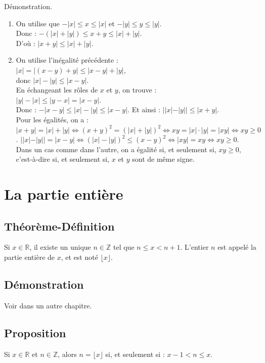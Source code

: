 \documentclass{article}
\begin{document}
		Démonstration. 
		\begin{enumerate}
			\item On utilise que $-|x| \leq x \leq |x|$ et $-|y| \leq y \leq |y|$. \\
			 Donc : $- (|x| + |y|) \leq x + y \leq |x| + |y|$. \\
			  D'où : $|x + y| \leq |x| + |y|$.
			\item On utilise l'inégalité précédente : \\ $|x| = |(x - y) + y| \leq |x - y| + |y|$,\\ donc $|x| - |y| \leq |x - y|$. \\ En échangeant les rôles de $x$ et $y$, on trouve : \\ $|y| - |x| \leq |y - x| = |x - y|$. \\ Donc : $-|x - y| \leq |x| - |y| \leq |x - y|$. Et ainsi : $||x| - |y|| \leq |x + y|$. \\ Pour les égalités, on a : $|x + y| = |x| + |y| \Leftrightarrow (x + y)^2 = (|x| + |y|)^2 \Leftrightarrow xy = |x| \cdot |y| = |xy| \Leftrightarrow xy \geq 0$. $||x| - |y|| = |x - y| \Leftrightarrow (|x| - |y|)^2 \leq (x - y)^2 \Leftrightarrow |xy| = xy \Leftrightarrow xy \geq 0$. \\ Dans un cas comme dans l'autre, on a égalité si, et seulement si, $xy \geq 0$, c'est-à-dire si, et seulement si, $x$ et $y$ sont de même signe.
		\end{enumerate}
		\section{La partie entière}
		
		\subsection{Théorème-Définition }
		Si $x \in \mathbb{R}$, il existe un unique $n \in \mathbb{Z}$ tel que $n \leq x < n + 1$. L'entier $n$ est appelé la partie entière de $x$, et est noté $\lfloor x \rfloor$.
		
		\subsection{Démonstration}
		Voir dans un autre chapitre.
		
		\subsection{Proposition }
		Si $x \in \mathbb{R}$ et $n \in \mathbb{Z}$, alors $n = \lfloor x \rfloor$ si, et seulement si : $x - 1 < n \leq x$.
		
\end{document}
